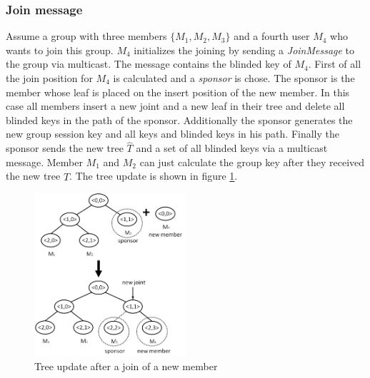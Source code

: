 \subsubsection{Join message}
Assume a group with three members $\{M_1, M_2, M_3\}$ and a fourth user $M_4$ who wants to join this group. $M_4$ initializes the joining by sending a \textit{JoinMessage} to the group via multicast. The message contains the blinded key of $M_4$. First of all the join position for $M_4$ is calculated and a \textit{sponsor} is chose. The sponsor is the member whose leaf is placed on the insert position of the new member. In this case all members insert a new joint and a new leaf in their tree and delete all blinded keys in the path of the sponsor. Additionally the sponsor generates the new group session key and all keys and blinded keys in his path. Finally the sponsor sends the new tree $\widehat{T}$ and a set of all blinded keys via a multicast message. Member $M_1$ and $M_2$ can just calculate the group key after they received the new tree $\widehat{T}$. The tree update is shown in figure \ref{fig:tgdh_join}.
\begin{figure}[!h]
\centering\includegraphics[width=0.5\textwidth]{Images/tgdh_join}
\caption{Tree update after a join of a new member}
\label{fig:tgdh_join}
\end{figure}

